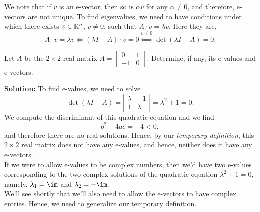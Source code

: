 We note that if $v$ is an e-vector, then so is $\alpha v$ for any $\alpha \neq 0$, and therefore, e-vectors are not unique. To find eigenvalues, we need to have conditions under which there exists $v \in \mathbb R^n$, $v \neq 0$, such that $A \cdot v=\lambda v$. Here they are,
    \begin{equation*}
        A \cdot v=\lambda v \iff(\lambda I-A)\cdot v=0 \overset{v\neq 0}{\iff} \det(\lambda I-A)=0.
    \end{equation*}
    
    
\begin{example}
\label{ex:Eigen01} Let $A$ be the $2 \times 2$ real matrix
 $A=\left[\begin{array}{rr}
    0 & 1\\
    -1 & 0
    \end{array}\right].$
Determine, if any, its e-values and e-vectors. 
\end{example}

\textbf{Solution:} To find e-values, we need to solve 
$$\det(\lambda I-A)= \left| \begin{array}{rr}
    \lambda & -1\\
    1 &\lambda
    \end{array} \right| =\lambda^2+1=0.$$
    We compute the discriminant of this quadratic equation and we find
    $$b^2-4ac = -4 <0,$$
    and therefore there are no real solutions. Hence, by our \textit{temporary definition}, this $2 \times 2$ real matrix does not have any e-values, and hence, neither does it have any e-vectors.\\
    
    If we were to allow e-values to be complex numbers, then we'd have two e-values corresponding to the two complex solutions of the quadratic equation $\lambda^2+1=0$, namely, $\lambda_1 = \im$ and $\lambda_2 = -\im$.\\
    
    We'll see shortly that we'll also need to allow the e-vectors to have complex entries. Hence, we need to generalize our temporary definition. 
\Qed
    
